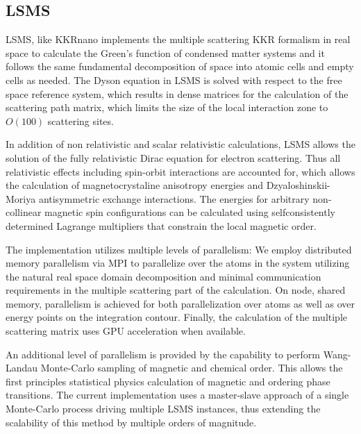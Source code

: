 \documentclass{llncs}
\def\KKRnano{{KKRnano}}
\def\LSMS{{LSMS}}
\begin{document}
\subsection{LSMS} \label{section:lsms}

\LSMS{}\cite{PhysRevLett.75.2867}, like \KKRnano{} implements the multiple
scattering KKR formalism in real space to calculate the Green's
function of condensed matter systems and it follows the same
fundamental decomposition of space into atomic cells and empty cells
as needed. The Dyson equation in \LSMS{} is solved with respect to the
free space reference system, which results in dense matrices for the
calculation of the scattering path matrix, which limits the size of
the local interaction zone to $O(100)$ scattering sites.

In addition of non relativistic and scalar relativistic
calculations, \LSMS{} allows the solution of the fully relativistic
Dirac equation for electron scattering. Thus all relativistic effects
including spin-orbit interactions are accounted for, which allows the
calculation of magnetocrystaline anisotropy energies and
Dzyaloshinskii-Moriya antisymmetric exchange interactions. The
energies for arbitrary non-collinear magnetic spin configurations can
be calculated using selfconsistently determined Lagrange multipliers
that constrain the local magnetic order. 

The implementation utilizes multiple levels of parallelism: We employ
distributed memory parallelism via MPI to parallelize over the atoms
in the system utilizing the natural real space domain decomposition
and minimal communication requirements in the multiple scattering part
of the calculation. On node, shared memory, parallelism is achieved
for both parallelization over atoms as well as over energy points on
the integration contour. Finally, the calculation of the multiple
scattering matrix uses GPU acceleration when available.  

An additional level of parallelism is provided by the capability to
perform Wang-Landau Monte-Carlo sampling of magnetic and chemical
order. This allows the first principles statistical physics
calculation of magnetic and ordering phase transitions. The current
implementation uses a master-slave approach of a single Monte-Carlo
process driving multiple \LSMS{} instances, thus extending the
scalability of this method by multiple orders of magnitude.
\end{document}
